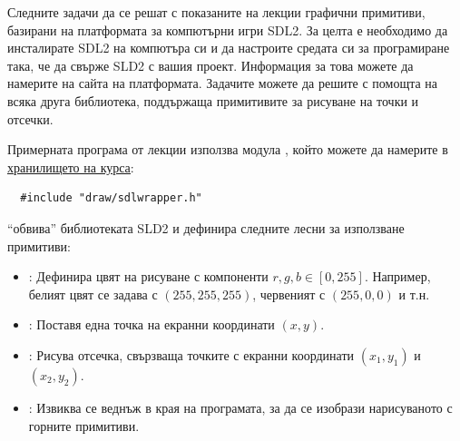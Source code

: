 {  \begin{mdframed}[hidealllines=true,backgroundcolor=gray!20]

  Следните задачи да се решат с показаните на лекции графични примитиви, базирани на платформата за компютърни игри SDL2. За целта е необходимо да инсталирате SDL2 на компютъра си и да настроите средата си за програмиране така, че да свърже SLD2 с вашия проект. Информация за това можете да намерите на сайта на платформата.
	Задачите можете да решите с помощта на всяка друга библиотека, поддържаща примитивите за рисуване на точки и отсечки.

  Примерната програма от лекции използва модула , който можете да намерите в \href{https://github.com/stranxter/lecture-notes/tree/master/samples/01_programming%20101/2022-23-kn/pixels/draw}{\underline{хранилището на курса}}:
  \begin{mdframed}[hidealllines=true,backgroundcolor=lightgray!20]
  \begin{verbatim}
  #include "draw/sdlwrapper.h"
  \end{verbatim}
  \end{mdframed}

   ``обвива'' библиотеката SLD2 и дефинира следните лесни за използване примитиви:

  \begin{itemize}
    \item {}: Дефинира цвят на рисуване с компоненти $r,g,b\in[0,255]$. Например, белият цвят се задава с $(255,255,255)$, червеният с $(255,0,0)$ и т.н.
    \item {}: Поставя една точка на екранни координати $(x,y)$.
    \item {}: Рисува отсечка, свързваща точките с екранни координати $(x_1,y_1)$ и $(x_2,y_2)$.
    \item {}: Извиква се веднъж в края на програмата, за да се изобрази нарисуваното с горните примитиви.
  \end{itemize}
\end{mdframed}

}
